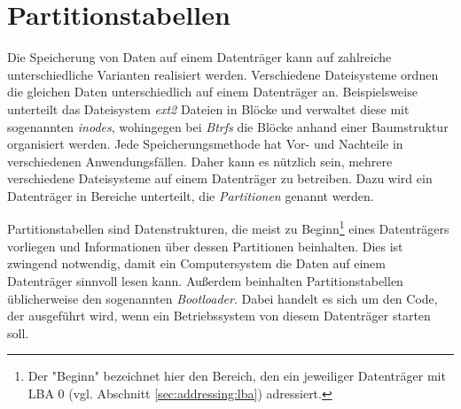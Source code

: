 \section{Partitionstabellen}
Die Speicherung von Daten auf einem Datenträger kann auf zahlreiche unterschiedliche Varianten realisiert werden.
Verschiedene Dateisysteme ordnen die gleichen Daten unterschiedlich auf einem Datenträger an.
Beispielsweise unterteilt das Dateisystem \textit{ext2} Dateien in Blöcke und verwaltet diese mit sogenannten \textit{inodes}, wohingegen bei \textit{Btrfs} die Blöcke anhand einer Baumstruktur organisiert werden. 
Jede Speicherungsmethode hat Vor- und Nachteile in verschiedenen Anwendungsfällen. 
Daher kann es nützlich sein, mehrere verschiedene Dateisysteme auf einem Datenträger zu betreiben.
Dazu wird ein Datenträger in Bereiche unterteilt, die \textit{Partitionen} genannt werden.

Partitionstabellen sind Datenstrukturen, die meist zu Beginn\footnote{
    Der "Beginn" bezeichnet hier den Bereich, den ein jeweiliger Datenträger mit LBA 0 (vgl. Abschnitt \ref{sec:addressing:lba}) adressiert.
}
eines Datenträgers vorliegen und Informationen über dessen Partitionen beinhalten.
Dies ist zwingend notwendig, damit ein Computersystem die Daten auf einem Datenträger sinnvoll lesen kann.
Außerdem beinhalten Partitionstabellen üblicherweise den sogenannten \textit{Bootloader}. Dabei handelt es sich um den Code, der ausgeführt wird, wenn ein Betriebssystem von diesem Datenträger starten soll.